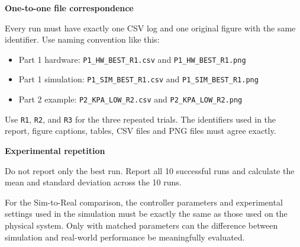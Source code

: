 \documentclass[11pt,a4paper]{article}
\begin{document}
\begin{requirementbox}
\textbf{One-to-one file correspondence}

Every run must have exactly one CSV log and one original figure with the same identifier. Use naming convention like this:
\begin{itemize}
\item Part 1 hardware: \texttt{P1\_HW\_BEST\_R1.csv} and \texttt{P1\_HW\_BEST\_R1.png}
\item Part 1 simulation: \texttt{P1\_SIM\_BEST\_R1.csv} and \texttt{P1\_SIM\_BEST\_R1.png}
\item Part 2 example: \texttt{P2\_KPA\_LOW\_R2.csv} and \texttt{P2\_KPA\_LOW\_R2.png}
\end{itemize}
Use \texttt{R1}, \texttt{R2}, and \texttt{R3} for the three repeated trials. The identifiers used in the report, figure captions, tables, CSV files and PNG files must agree exactly.
\end{requirementbox}



\begin{requirementbox}
\textbf{Experimental repetition}

Do not report only the best run. Report all 10 successful runs and calculate the mean and standard deviation across the 10 runs.

For the Sim-to-Real comparison, the controller parameters and experimental settings used in the simulation must be exactly the same as those used on the physical system. Only with matched parameters can the difference between simulation and real-world performance be meaningfully evaluated.
\end{requirementbox}
\end{document}
